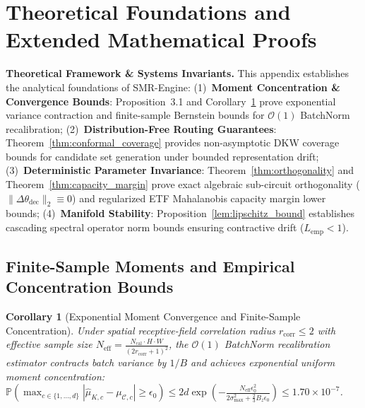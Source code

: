 \documentclass{article}
\newtheorem{corollary}{Corollary}[section]
\begin{document}
\appendix
\raggedbottom
\renewcommand{\thetable}{\Alph{section}\arabic{table}}
\renewcommand{\thefigure}{\Alph{section}\arabic{figure}}
\renewcommand{\theHtable}{\Alph{section}.\arabic{table}}
\renewcommand{\theHfigure}{\Alph{section}.\arabic{figure}}
\setlength{\floatsep}{1.5pt plus 1.0pt minus 1.0pt}
\setlength{\textfloatsep}{2.0pt plus 1.0pt minus 1.0pt}
\setlength{\intextsep}{1.5pt plus 1.0pt minus 1.0pt}
\setlength{\abovedisplayskip}{2.0pt plus 1pt minus 1pt}
\setlength{\belowdisplayskip}{2.0pt plus 1pt minus 1pt}
\setlength{\abovedisplayshortskip}{0pt}
\setlength{\belowdisplayshortskip}{0pt}

\section{Theoretical Foundations and Extended Mathematical Proofs}
\label{sec:app_theory}
\label{sec:proofs}

\noindent\textbf{Theoretical Framework \& Systems Invariants.}
This appendix establishes the analytical foundations of SMR-Engine:
(1)~\textbf{Moment Concentration \& Convergence Bounds}: Proposition~3.1 and Corollary~\ref{cor:moment_convergence} prove exponential variance contraction and finite-sample Bernstein bounds for $\mathcal{O}(1)$ BatchNorm recalibration;
(2)~\textbf{Distribution-Free Routing Guarantees}: Theorem~\ref{thm:conformal_coverage} provides non-asymptotic DKW coverage bounds for candidate set generation under bounded representation drift;
(3)~\textbf{Deterministic Parameter Invariance}: Theorem~\ref{thm:orthogonality} and Theorem~\ref{thm:capacity_margin} prove exact algebraic sub-circuit orthogonality ($\|\Delta \theta_{\mathrm{dec}}\|_2 \equiv 0$) and regularized ETF Mahalanobis capacity margin lower bounds;
(4)~\textbf{Manifold Stability}: Proposition~\ref{lem:lipschitz_bound} establishes cascading spectral operator norm bounds ensuring contractive drift ($L_{\mathrm{emp}} < 1$).

\subsection{Finite-Sample Moments and Empirical Concentration Bounds}
\label{sec:proof_finite_sample}

\begin{corollary}[Exponential Moment Convergence and Finite-Sample Concentration]
\label{cor:moment_convergence}
Under spatial receptive-field correlation radius $r_{\mathrm{corr}} \le 2$ with effective sample size $N_{\mathrm{eff}} = \frac{N_{\mathrm{cal}} \cdot H \cdot W}{(2r_{\mathrm{corr}} + 1)^2}$, the $\mathcal{O}(1)$ BatchNorm recalibration estimator contracts batch variance by $1/B$ and achieves exponential uniform moment concentration: $\mathbb{P}\left(\max_{c \in \{1,\dots,d\}} |\hat{\mu}_{K,c} - \mu_{\mathcal{C},c}| \ge \epsilon_0\right) \le 2d \exp\left(-\frac{N_{\mathrm{eff}}\epsilon_0^2}{2\sigma_{\max}^2 + \frac{2}{3}B_z\epsilon_0}\right) \le 1.70 \times 10^{-7}$.
\end{corollary}
\end{document}

